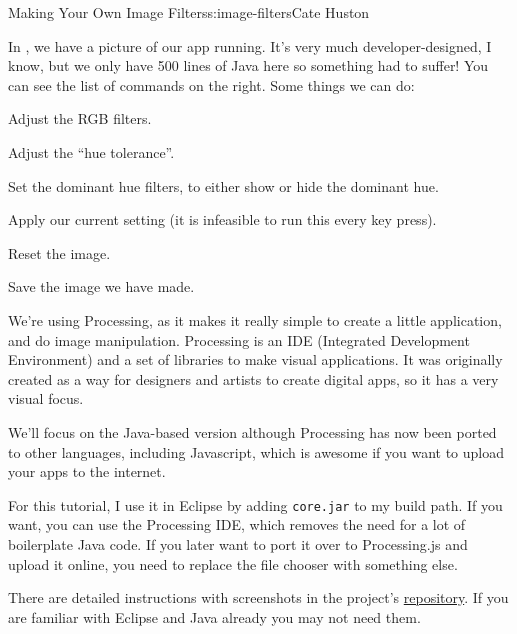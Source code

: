 \begin{aosachapter}{Making Your Own Image Filters}{s:image-filters}{Cate Huston}
\label{running-the-app}

In , we have a picture of our app
running. It's very much developer-designed, I know, but we only have 500
lines of Java here so something had to suffer! You can see the list of
commands on the right. Some things we can do:

\begin{aosaitemize}

\item
  Adjust the RGB filters.
\item
  Adjust the ``hue tolerance''.
\item
  Set the dominant hue filters, to either show or hide the dominant hue.
\item
  Apply our current setting (it is infeasible to run this every key
  press).
\item
  Reset the image.
\item
  Save the image we have made.
\end{aosaitemize}


We're using Processing, as it makes it really simple to create a little
application, and do image manipulation. Processing is an IDE (Integrated
Development Environment) and a set of libraries to make visual
applications. It was originally created as a way for designers and
artists to create digital apps, so it has a very visual focus.

We'll focus on the Java-based version although Processing has now been
ported to other languages, including Javascript, which is awesome if you
want to upload your apps to the internet.

For this tutorial, I use it in Eclipse by adding \texttt{core.jar} to my
build path. If you want, you can use the Processing IDE, which removes
the need for a lot of boilerplate Java code. If you later want to port
it over to Processing.js and upload it online, you need to replace the
file chooser with something else.

There are detailed instructions with screenshots in the project's
\href{https://github.com/aosabook/500lines/blob/master/image-filters/SETUP.MD}{repository}.
If you are familiar with Eclipse and Java already you may not need them.

\label{processing-basics}

\label{size-and-color}


\end{aosachapter}
